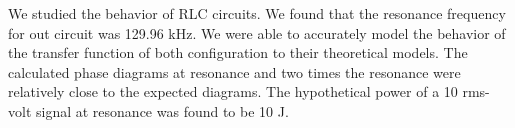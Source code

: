 \documentclass[11pt,letterpaper,onecolumn]{article}
\begin{document}
We studied the behavior of RLC circuits. We found that the resonance frequency for out circuit was 129.96 kHz. We were able to accurately model the behavior of the transfer function of both configuration to their theoretical models. The calculated phase diagrams at resonance and two times the resonance were relatively close to the expected diagrams. The hypothetical power of a 10 rms-volt signal at resonance was found to be 10 J. 





\end{document}
